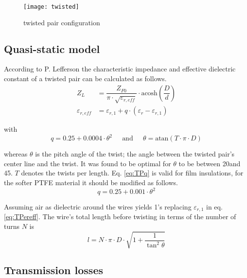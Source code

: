 \begin{figure}[ht]
\begin{center}
\texttt{[image: twisted]}
\end{center}
\caption{twisted pair configuration}
\label{fig:twisted}
\end{figure}
\FloatBarrier

\subsection{Quasi-static model}

According to P. Lefferson \cite{Lefferson} the characteristic
impedance and effective dielectric constant of a twisted pair can be
calculated as follows.
\begin{align}
Z_L &= \dfrac{Z_{F0}}{\pi\cdot\sqrt{\varepsilon_{r,eff}}}\cdot\textrm{acosh}\left(\dfrac{D}{d}\right)\\
\label{eq:TPereff}
\varepsilon_{r,eff} &= \varepsilon_{r,1} + q\cdot\left(\varepsilon_r - \varepsilon_{r,1}\right)
\end{align}

with
\begin{equation}
\label{eq:TPq}
q = 0.25 + 0.0004\cdot \theta^2
\;\;\;\; \textrm{ and } \;\;\;\;
\theta = \textrm{atan}\left(T\cdot\pi\cdot D\right)
\end{equation}

whereas $\theta$ is the pitch angle of the twist; the angle between
the twisted pair's center line and the twist.  It was found to be
optimal for $\theta$ to be between 20\degree and 45\degree.  $T$
denotes the twists per length.  Eq. \eqref{eq:TPq} is valid for film
insulations, for the softer PTFE material it should be modified as
follows.
\begin{equation}
q = 0.25 + 0.001\cdot \theta^2
\end{equation}

Assuming air as dielectric around the wires yields 1's replacing
$\varepsilon_{r,1}$ in eq. \eqref{eq:TPereff}.  The wire's total
length before twisting in terms of the number of turns $N$ is
\begin{equation}
l = N\cdot\pi\cdot D\cdot\sqrt{1 + \dfrac{1}{\tan^2{\theta}}}
\end{equation}

\subsection{Transmission losses}

